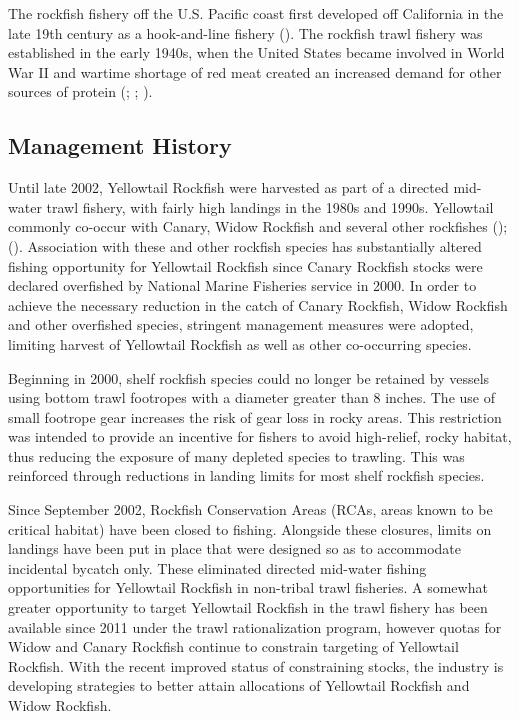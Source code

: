 \documentclass[
]{scrartcl}
\begin{document}
The rockfish fishery off the U.S. Pacific coast first developed off
California in the late 19th century as a hook-and-line fishery
(). The rockfish trawl fishery
was established in the early 1940s, when the United States became
involved in World War II and wartime shortage of red meat created an
increased demand for other sources of protein
(;
;
).

\subsection{Management History}\label{management-history}

Until late 2002, Yellowtail Rockfish were harvested as part of a
directed mid-water trawl fishery, with fairly high landings in the 1980s
and 1990s. Yellowtail commonly co-occur with Canary, Widow Rockfish and
several other rockfishes ();
(). Association with
these and other rockfish species has substantially altered fishing
opportunity for Yellowtail Rockfish since Canary Rockfish stocks were
declared overfished by National Marine Fisheries service in 2000. In
order to achieve the necessary reduction in the catch of Canary
Rockfish, Widow Rockfish and other overfished species, stringent
management measures were adopted, limiting harvest of Yellowtail
Rockfish as well as other co-occurring species.

Beginning in 2000, shelf rockfish species could no longer be retained by
vessels using bottom trawl footropes with a diameter greater than 8
inches. The use of small footrope gear increases the risk of gear loss
in rocky areas. This restriction was intended to provide an incentive
for fishers to avoid high-relief, rocky habitat, thus reducing the
exposure of many depleted species to trawling. This was reinforced
through reductions in landing limits for most shelf rockfish species.

Since September 2002, Rockfish Conservation Areas (RCAs, areas known to
be critical habitat) have been closed to fishing. Alongside these
closures, limits on landings have been put in place that were designed
so as to accommodate incidental bycatch only. These eliminated directed
mid-water fishing opportunities for Yellowtail Rockfish in non-tribal
trawl fisheries. A somewhat greater opportunity to target Yellowtail
Rockfish in the trawl fishery has been available since 2011 under the
trawl rationalization program, however quotas for Widow and Canary
Rockfish continue to constrain targeting of Yellowtail Rockfish. With
the recent improved status of constraining stocks, the industry is
developing strategies to better attain allocations of Yellowtail
Rockfish and Widow Rockfish.
\end{document}
